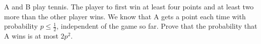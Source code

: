 A and B play tennis. The player to first win at least four points and at least two more than the other player wins. We know that A gets a point each time with probability $p\le \frac12$, independent of the game so far. Prove that the probability that A wins is at most $2p^2$.